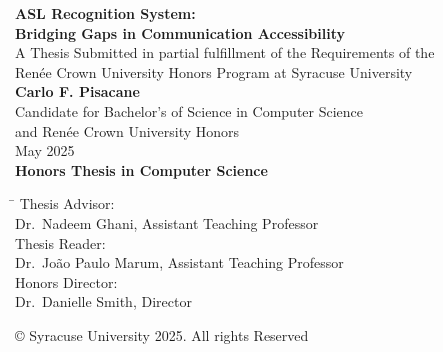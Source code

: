 \documentclass[12pt]{article}
\begin{document}
\begin{titlepage}
\begin{center}

{\Large \textbf{ASL Recognition System:\\[6pt] Bridging Gaps in Communication Accessibility}}\\[2cm]

{\normalsize A Thesis Submitted in partial fulfillment of the Requirements of the\\
Renée Crown University Honors Program at Syracuse University}\\[1.5cm]

{\large \textbf{Carlo F. Pisacane}}\\[0.5cm]
{\normalsize Candidate for Bachelor’s of Science in Computer Science\\
and Renée Crown University Honors\\
May 2025}\\[3cm]

{\Large \textbf{Honors Thesis in Computer Science}}\\[1.5cm]
\begin{tabbing}
\hspace*{3cm}\= \kill
Thesis Advisor:\> \underline{\hspace{4cm}} \\
\> Dr.\ Nadeem Ghani, Assistant Teaching Professor\\[1cm]
Thesis Reader:\> \underline{\hspace{4cm}} \\
\> Dr.\ João Paulo Marum, Assistant Teaching Professor\\[1cm]
Honors Director:\> \underline{\hspace{4cm}} \\
\> Dr.\ Danielle Smith, Director
\end{tabbing}
\vfill

\end{center}
\end{titlepage}

\clearpage
{}
\setcounter{page}{1}
\pagestyle{plain}


\newpage
\vspace*{\fill}        
\begin{center}
    {\small © Syracuse University 2025. All rights Reserved}
\end{center}
\vspace*{\fill}
\newpage
\end{document}
